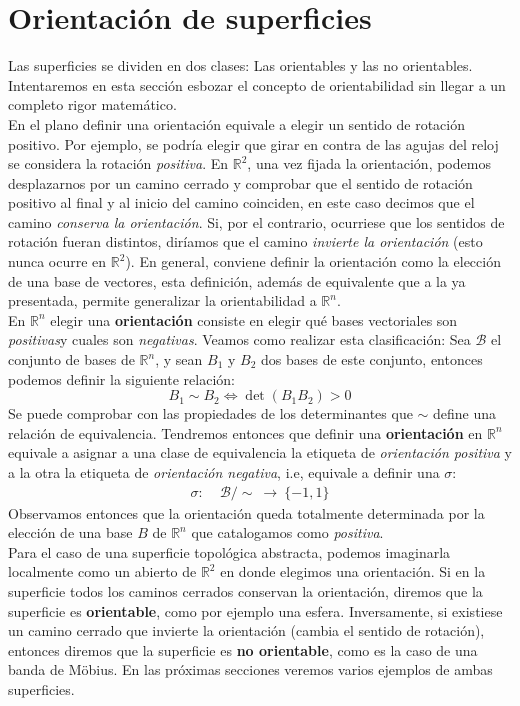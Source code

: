 \documentclass[a4paper,11pt,spanish, twoside, leqno]{tfg-uam}
\newcommand*{\reales}{\mathbb{R}}
\theoremstyle{definition}
\begin{document}
\section{Orientación de superficies}
Las superficies se dividen en dos clases: Las orientables y las no orientables. Intentaremos en esta sección esbozar el concepto de orientabilidad sin llegar a un completo rigor matemático.\\

En el plano definir una orientación equivale a elegir un sentido de rotación positivo. Por ejemplo, se podría elegir que girar en contra de las agujas del reloj se considera la rotación \textit{positiva}. En $\mathbb{R}^2$,  una vez fijada la orientación, podemos desplazarnos por un camino cerrado y comprobar que el sentido de rotación positivo al final y al inicio del camino coinciden, en este caso decimos que el camino \textit{conserva la orientación}. Si, por el contrario, ocurriese que los sentidos de rotación fueran distintos, diríamos que el camino \textit{invierte la orientación} (esto nunca ocurre en $\mathbb{R}^2$). En general, conviene definir la orientación como la elección de una base de vectores, esta definición, además de equivalente que a la ya presentada, permite generalizar la orientabilidad a $\mathbb{R}^n$.\\

En $\mathbb{R}^n$ elegir una \textbf{orientación} consiste en elegir qué bases vectoriales son \textit{positivas}y cuales son \textit{negativas}. Veamos como realizar esta clasificación:  Sea $\mathcal{B}$ el conjunto de bases de $\reales^n$,  y sean $B_1$ y $B_2$ dos bases de este conjunto, entonces podemos definir la siguiente relación:
\[
    B_1 \sim B_2 
    \Longleftrightarrow
    \det(B_1 B_2) > 0
\] 
Se puede comprobar con las propiedades de los determinantes que $\sim$ define una relación de equivalencia. Tendremos entonces que definir una \textbf{orientación} en $\mathbb{R}^n$ equivale a asignar a una clase de equivalencia la etiqueta de  \textit{orientación positiva} y a la otra la etiqueta de  \textit{orientación negativa}, i.e, equivale a definir una $\sigma$:
\begin{align*}
    \sigma: \; & \mathcal{B}/\sim \:\longrightarrow \: \{-1, 1\}
\end{align*}
Observamos entonces que la orientación queda totalmente determinada por la elección de una base $B$ de $\mathbb{R}^n$ que catalogamos como \textit{positiva}.
\\

Para el caso de una superficie topológica abstracta, podemos imaginarla localmente como un abierto de $\reales^2$ en donde elegimos una orientación. Si en la superficie todos los caminos cerrados conservan la orientación, diremos que la superficie es \textbf{orientable}, como por ejemplo una esfera. Inversamente, si existiese un camino cerrado que invierte la orientación (cambia el sentido de rotación), entonces diremos que la superficie es \textbf{no orientable}, como es la caso de una banda de M\"obius. En las próximas secciones veremos varios ejemplos de ambas superficies.
\\
\end{document}
